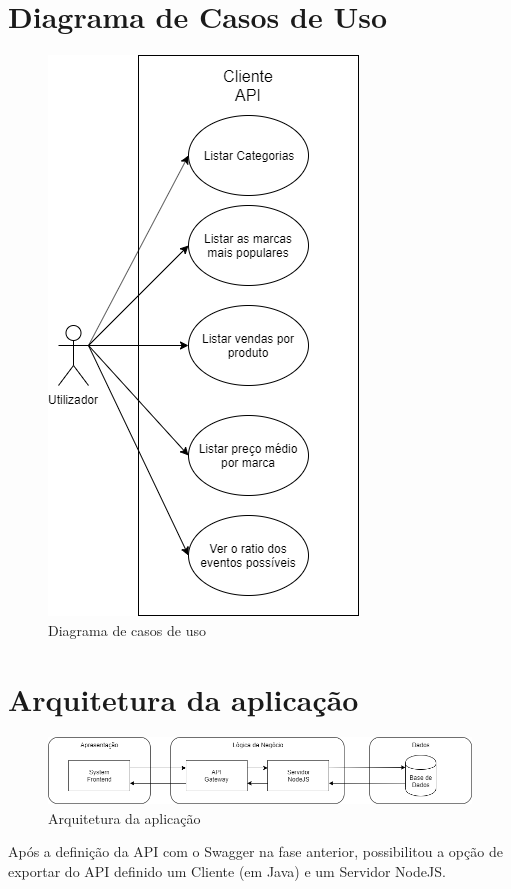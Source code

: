 \documentclass[11pt,a4paper]{article}
\begin{document}
\section{Diagrama de Casos de Uso}
\begin{figure}[H]
  \centering
  \includegraphics[scale=0.5]{Use_Cases.png}
  \caption{Diagrama de casos de uso}
\end{figure}

\section{Arquitetura da aplicação}
\begin{figure}[H]
  \centering
  \includegraphics[scale=0.4]{App_arc.png}
  \caption{Arquitetura da aplicação}
\end{figure}

Após a definição da API com o Swagger na fase anterior, possibilitou a opção de exportar do API definido um Cliente (em Java) e um Servidor NodeJS.
\end{document}
